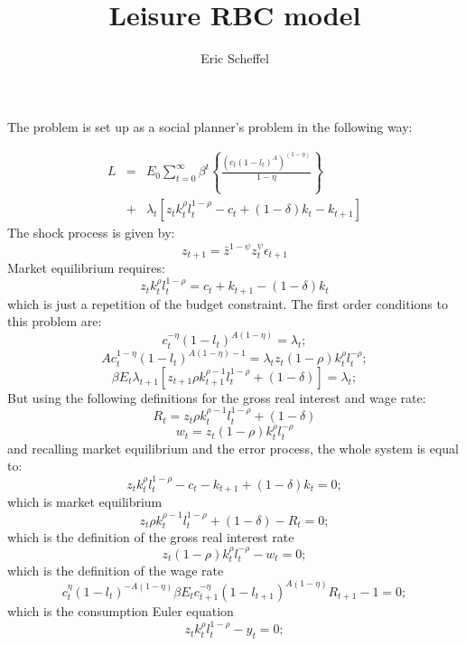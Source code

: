 \documentclass[a4paper,11pt]{article}
\title{Leisure RBC model}
\author{Eric Scheffel}
\begin{document}
\maketitle



The problem is set up as a social planner's problem in the following way:

\begin{eqnarray*}
L & = & E_0\sum_{t=0}^\infty\beta^t\left\lbrace\frac{\left(c_t\left(1-l_t\right)^A\right)^{\left(1-\eta\right)}}{1-\eta}\right\rbrace\\
  & + & \lambda_t\left[z_tk_t^\rho l_t^{1-\rho}-c_t+\left(1-\delta\right)k_t-k_{t+1}\right]
\end{eqnarray*}
The shock process is given by:
\[z_{t+1}=\bar{z}^{1-\psi}z_t^\psi\epsilon_{t+1}\]
Market equilibrium requires:
\[z_tk_t^\rho l_t^{1-\rho} = c_t+k_{t+1}-\left(1-\delta\right)k_t\]
which is just a repetition of the budget constraint.
The first order conditions to this problem are:
\[
c_t^{-\eta}\left(1-l_t\right)^{A\left(1-\eta\right)}=\lambda_t;
\]
\[
Ac_t^{1-\eta}\left(1-l_t\right)^{A\left(1-\eta\right)-1}=\lambda_tz_t\left(1-\rho\right)k_t^\rho l_t^{-\rho};
\]
\[
\beta E_t\lambda_{t+1}\left[z_{t+1}\rho k_{t+1}^{\rho-1}l_t^{1-\rho}+\left(1-\delta\right)\right]=\lambda_t;
\]
But using the following definitions for the gross real interest and wage rate:
\[
R_t=z_t\rho k_t^{\rho-1}l_t^{1-\rho}+\left(1-\delta\right)
\]
\[
w_t=z_t\left(1-\rho\right)k_t^\rho l_t^{-\rho}
\]
and recalling market equilibrium and the error process, the whole system is equal to:
\begin{equation}
z_tk_t^\rho l_t^{1-\rho}-c_t-k_{t+1}+\left(1-\delta\right)k_t=0;
\end{equation}
which is market equilibrium
\begin{equation}
z_t\rho k_t^{\rho-1}l_t^{1-\rho}+\left(1-\delta\right)-R_t=0;
\end{equation}
which is the definition of the gross real interest rate
\begin{equation}
z_t\left(1-\rho\right)k_t^\rho l_t^{-\rho}-w_t=0;
\end{equation}
which is the definition of the wage rate
\begin{equation}
c_t^\eta\left(1-l_t\right)^{-A\left(1-\eta\right)}\beta E_t c_{t+1}^{-\eta}\left(1-l_{t+1}\right)^{A\left(1-\eta\right)}R_{t+1}-1=0;
\end{equation}
which is the consumption Euler equation
\begin{equation}
z_t k_t^\rho l_t^{1-\rho}-y_t=0;
\end{equation}
\end{document}
